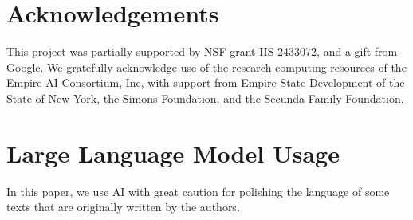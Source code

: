 \documentclass{article} %
\begin{document}
\section{Acknowledgements}
This project was partially supported by NSF grant IIS-2433072, and a gift from Google. We gratefully acknowledge use of the research computing resources of the Empire AI Consortium, Inc, with support from Empire State Development of the State of New York, the Simons Foundation, and the Secunda Family Foundation.





\newpage    
\appendix

\section{Large Language Model Usage}
In this paper, we use AI  with great caution for polishing the language of some texts that are originally written by the authors.
\end{document}
